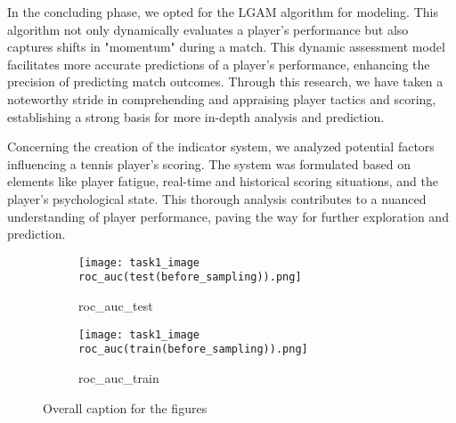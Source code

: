 \documentclass{article}
\begin{document}
In the concluding phase, we opted for the LGAM algorithm for modeling. This algorithm not only dynamically evaluates a player's performance but also captures shifts in "momentum" during a match. This dynamic assessment model facilitates more accurate predictions of a player's performance, enhancing the precision of predicting match outcomes. Through this research, we have taken a noteworthy stride in comprehending and appraising player tactics and scoring, establishing a strong basis for more in-depth analysis and prediction.

Concerning the creation of the indicator system, we analyzed potential factors influencing a tennis player's scoring. The system was formulated based on elements like player fatigue, real-time and historical scoring situations, and the player's psychological state. This thorough analysis contributes to a nuanced understanding of player performance, paving the way for further exploration and prediction.
\begin{figure}[htbp]
      \centering
      \begin{subfigure}{0.48\textwidth} %
          \texttt{[image: task1\_image\\roc\_auc(test(before\_sampling)).png]} %
          \caption{roc_auc_test}
          \label{fig:roc_test}
      \end{subfigure}
      \hfill %
      \begin{subfigure}{0.48\textwidth} %
          \texttt{[image: task1\_image\\roc\_auc(train(before\_sampling)).png]} %
          \caption{roc_auc_train}
          \label{fig:roc_train}
      \end{subfigure}
      \caption{Overall caption for the figures}
      \label{fig:overall}
\end{figure}


\end{document}
